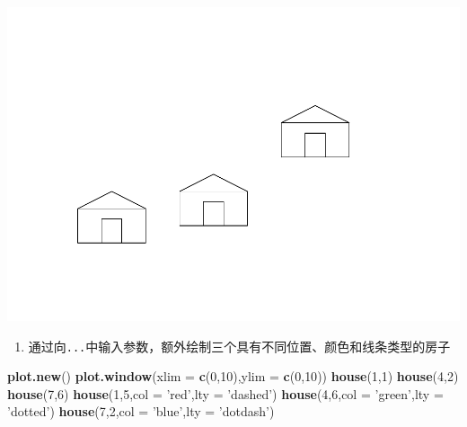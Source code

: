 \documentclass[]{article}
\newenvironment{Shaded}{\begin{snugshade}}{\end{snugshade}}
\newcommand{\DataTypeTok}[1]{\textcolor[rgb]{0.13,0.29,0.53}{#1}}
\newcommand{\DecValTok}[1]{\textcolor[rgb]{0.00,0.00,0.81}{#1}}
\newcommand{\KeywordTok}[1]{\textcolor[rgb]{0.13,0.29,0.53}{\textbf{#1}}}
\newcommand{\NormalTok}[1]{#1}
\newcommand{\StringTok}[1]{\textcolor[rgb]{0.31,0.60,0.02}{#1}}
\providecommand{\tightlist}{%
  \setlength{\itemsep}{0pt}\setlength{\parskip}{0pt}}
\begin{document}
\includegraphics{Homework_4_files/figure-latex/unnamed-chunk-3-1.pdf}

\begin{enumerate}
\def\labelenumi{\alph{enumi}.}
\setcounter{enumi}{3}
\tightlist
\item
  通过向\texttt{...}中输入参数，额外绘制三个具有不同位置、颜色和线条类型的房子
\end{enumerate}

\begin{Shaded}
\begin{Highlighting}[]
\KeywordTok{plot.new}\NormalTok{()}
\KeywordTok{plot.window}\NormalTok{(}\DataTypeTok{xlim =} \KeywordTok{c}\NormalTok{(}\DecValTok{0}\NormalTok{,}\DecValTok{10}\NormalTok{),}\DataTypeTok{ylim =} \KeywordTok{c}\NormalTok{(}\DecValTok{0}\NormalTok{,}\DecValTok{10}\NormalTok{))}
\KeywordTok{house}\NormalTok{(}\DecValTok{1}\NormalTok{,}\DecValTok{1}\NormalTok{)}
\KeywordTok{house}\NormalTok{(}\DecValTok{4}\NormalTok{,}\DecValTok{2}\NormalTok{)}
\KeywordTok{house}\NormalTok{(}\DecValTok{7}\NormalTok{,}\DecValTok{6}\NormalTok{)}
\KeywordTok{house}\NormalTok{(}\DecValTok{1}\NormalTok{,}\DecValTok{5}\NormalTok{,}\DataTypeTok{col =} \StringTok{'red'}\NormalTok{,}\DataTypeTok{lty =} \StringTok{'dashed'}\NormalTok{)}
\KeywordTok{house}\NormalTok{(}\DecValTok{4}\NormalTok{,}\DecValTok{6}\NormalTok{,}\DataTypeTok{col =} \StringTok{'green'}\NormalTok{,}\DataTypeTok{lty =} \StringTok{'dotted'}\NormalTok{)}
\KeywordTok{house}\NormalTok{(}\DecValTok{7}\NormalTok{,}\DecValTok{2}\NormalTok{,}\DataTypeTok{col =} \StringTok{'blue'}\NormalTok{,}\DataTypeTok{lty =} \StringTok{'dotdash'}\NormalTok{)}
\end{Highlighting}
\end{Shaded}
\end{document}

